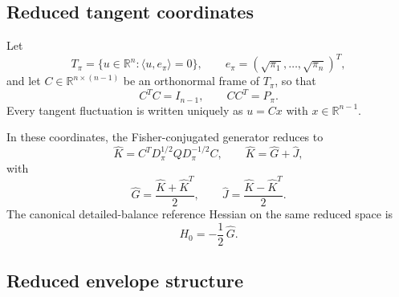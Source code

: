 \documentclass[11pt,a4paper]{article}
\numberwithin{equation}{section}
\theoremstyle{thmcompact}
\theoremstyle{remark}
\begin{document}
\subsection{Reduced tangent coordinates}

Let
\begin{equation}
T_\pi=\{u\in\mathbb R^n:\langle u,e_\pi\rangle=0\},
\qquad
e_\pi=(\sqrt{\pi_1},\dots,\sqrt{\pi_n})^T,
\end{equation}
and let \(C\in\mathbb R^{n\times (n-1)}\) be an orthonormal frame of \(T_\pi\), so that
\begin{equation}
C^TC=I_{n-1},
\qquad
CC^T=P_\pi.
\end{equation}
Every tangent fluctuation is written uniquely as \(u=Cx\) with \(x\in\mathbb R^{n-1}\).

In these coordinates, the Fisher-conjugated generator reduces to
\begin{equation}
\widehat K=C^T D_\pi^{1/2} Q D_\pi^{-1/2} C,
\qquad
\widehat K=\widehat G+\widehat J,
\end{equation}
with
\begin{equation}
\widehat G=\frac{\widehat K+\widehat K^T}{2},
\qquad
\widehat J=\frac{\widehat K-\widehat K^T}{2}.
\end{equation}
The canonical detailed-balance reference Hessian on the same reduced space is
\begin{equation}
H_0=-\frac12\,\widehat G.
\end{equation}

\subsection{Reduced envelope structure}
\end{document}
